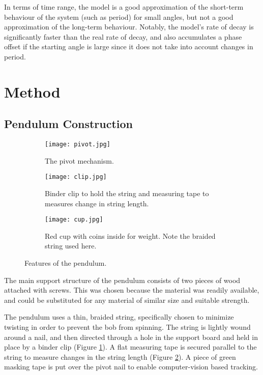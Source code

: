 \documentclass[aps,twocolumn,secnumarabic,nobalancelastpage,amsmath,amssymb,nofootinbib,floatfix,letterpaper]{revtex4}
\begin{document}
In terms of time range, the model is a good approximation of the short-term behaviour of the system (such as period)
for small angles, but not a good approximation of the long-term behaviour. Notably, the model's rate of decay is
significantly faster than the real rate of decay, and also accumulates a phase offset if the starting angle is large
since it does not take into account changes in period.


\section{Method}

\subsection{Pendulum Construction}

\begin{figure}[htb]
    \centering
    \begin{subfigure}{\linewidth}
        \texttt{[image: pivot.jpg]}
        \caption{The pivot mechanism.}
        \label{fig:pivot}
    \end{subfigure}
    \begin{subfigure}[t]{0.49\linewidth}
        \texttt{[image: clip.jpg]}
        \caption{Binder clip to hold the string and measuring tape to measures change in string length.}
        \label{fig:clip}
    \end{subfigure}
    \begin{subfigure}[t]{0.49\linewidth}
        \texttt{[image: cup.jpg]}
        \caption{Red cup with coins inside for weight. Note the braided string used here.}
        \label{fig:cup}
    \end{subfigure}
    \caption{Features of the pendulum.}
\end{figure}

The main support structure of the pendulum consists of two pieces of wood attached with screws.
This was chosen because the material was readily available, and could be substituted for any material of
similar size and suitable strength.

The pendulum uses a thin, braided string, specifically chosen to minimize twisting in order to prevent the bob from
spinning. The string is lightly wound around a nail, and then directed through a hole in the support board and held
in place by a binder clip (Figure \ref{fig:pivot}). A flat measuring tape is secured parallel to the string to measure
changes in the string length (Figure \ref{fig:clip}). A piece of green masking tape is put over the pivot nail to enable
computer-vision based tracking.
\end{document}
